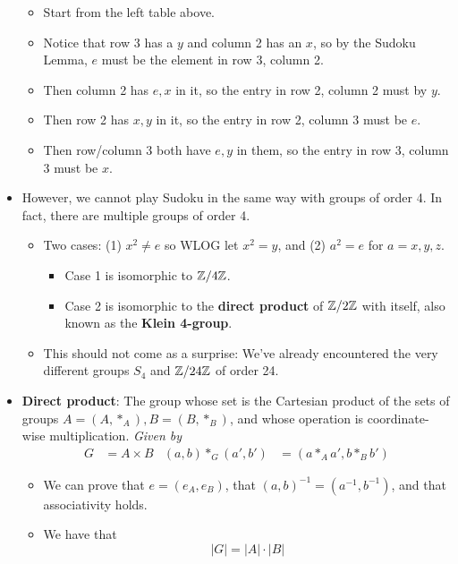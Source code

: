 \documentclass[../notes.tex]{subfiles}
\begin{document}
\begin{itemize}
\begin{itemize}
        \item Start from the left table above.
        \item Notice that row 3 has a $y$ and column 2 has an $x$, so by the Sudoku Lemma, $e$ must be the element in row 3, column 2.
        \item Then column 2 has $e,x$ in it, so the entry in row 2, column 2 must by $y$.
        \item Then row 2 has $x,y$ in it, so the entry in row 2, column 3 must be $e$.
        \item Then row/column 3 both have $e,y$ in them, so the entry in row 3, column 3 must be $x$.
    \end{itemize}
    \item However, we cannot play Sudoku in the same way with groups of order 4. In fact, there are multiple groups of order 4.
    \begin{itemize}
        \item Two cases: (1) $x^2\neq e$ so WLOG let $x^2=y$, and (2) $a^2=e$ for $a=x,y,z$.
        \begin{itemize}
            \item Case 1 is isomorphic to $\mathbb{Z}/4\mathbb{Z}$.
            \item Case 2 is isomorphic to the \textbf{direct product} of $\mathbb{Z}/2\mathbb{Z}$ with itself, also known as the \textbf{Klein 4-group}.
        \end{itemize}
        \item This should not come as a surprise: We've already encountered the very different groups $S_4$ and $\mathbb{Z}/24\mathbb{Z}$ of order 24.
    \end{itemize}
    \item \textbf{Direct product}: The group whose set is the Cartesian product of the sets of groups $A=(A,*_A),B=(B,*_B)$, and whose operation is coordinate-wise multiplication. \emph{Given by}
    \begin{align*}
        G &= A\times B&
        (a,b)*_G(a',b') &= (a*_Aa',b*_Bb')
    \end{align*}
    \begin{itemize}
        \item We can prove that $e=(e_A,e_B)$, that $(a,b)^{-1}=(a^{-1},b^{-1})$, and that associativity holds.
        \item We have that
        \begin{equation*}
            |G| = |A|\cdot|B|
        \end{equation*}
    \end{itemize}

\end{itemize}
\end{document}
